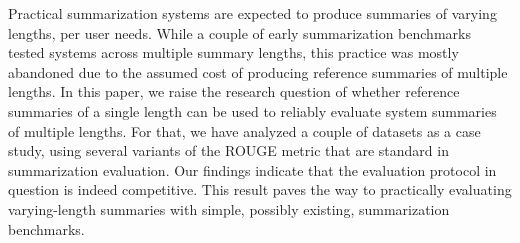 Practical summarization systems are expected to produce summaries of varying lengths, per user needs. While a couple of early summarization benchmarks tested systems across multiple summary lengths, this practice was mostly abandoned due to the assumed cost of producing reference summaries of multiple lengths. In this paper, we raise the research question of whether reference summaries of a single length can be used to reliably evaluate system summaries of multiple lengths. For that, we have analyzed a couple of datasets as a case study, using several variants of the ROUGE metric that are standard in summarization evaluation. Our findings indicate that the evaluation protocol in question is indeed competitive. This result paves the way to practically evaluating varying-length summaries with simple, possibly existing, summarization benchmarks.
